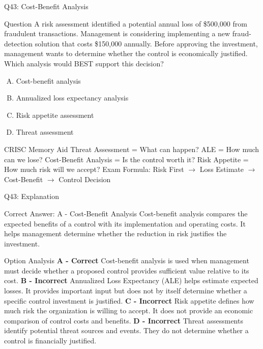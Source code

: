 \documentclass{beamer}
\begin{document}
	
	\begin{frame}{Q43: Cost-Benefit Analysis} \begin{block}{Question} A risk assessment identified a potential annual loss of \$500,000 from fraudulent transactions. Management is considering implementing a new fraud-detection solution that costs \$150,000 annually. Before approving the investment, management wants to determine whether the control is economically justified. Which analysis would BEST support this decision? \end{block} \begin{enumerate}[(A)] \item Cost-benefit analysis \item Annualized loss expectancy analysis \item Risk appetite assessment \item Threat assessment \end{enumerate}  \begin{block}{CRISC Memory Aid} Threat Assessment = What can happen? \vspace{0.1cm} ALE = How much can we lose? \vspace{0.1cm} Cost-Benefit Analysis = Is the control worth it? \vspace{0.1cm} Risk Appetite = How much risk will we accept? \vspace{0.15cm} Exam Formula: Risk First $\rightarrow$ Loss Estimate $\rightarrow$ Cost-Benefit $\rightarrow$ Control Decision \end{block} \end{frame}
	\begin{frame}[shrink=10]{Q43: Explanation} \footnotesize \begin{block}{Correct Answer: A - Cost-Benefit Analysis} Cost-benefit analysis compares the expected benefits of a control with its implementation and operating costs. It helps management determine whether the reduction in risk justifies the investment. \end{block} \begin{block}{Option Analysis} \textbf{A - Correct} Cost-benefit analysis is used when management must decide whether a proposed control provides sufficient value relative to its cost. \vspace{0.15cm} \textbf{B - Incorrect} Annualized Loss Expectancy (ALE) helps estimate expected losses. It provides important input but does not by itself determine whether a specific control investment is justified. \vspace{0.15cm} \textbf{C - Incorrect} Risk appetite defines how much risk the organization is willing to accept. It does not provide an economic comparison of control costs and benefits. \vspace{0.15cm} \textbf{D - Incorrect} Threat assessments identify potential threat sources and events. They do not determine whether a control is financially justified. \end{block}  \end{frame}
	
\end{document}
